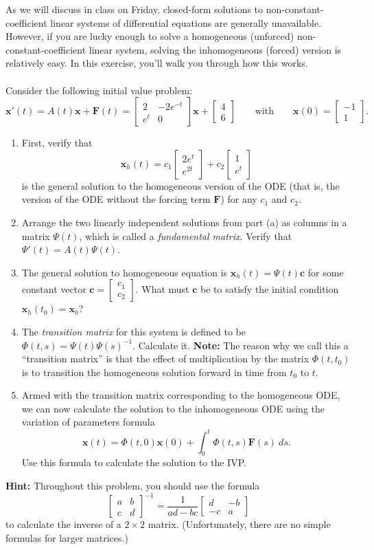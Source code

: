 \documentclass[12pt,letterpaper]{hmcpset}
\newcommand{\m}[1]{\begin{bmatrix} #1 \end{bmatrix}}
\newcommand{\f}[2]{\frac{#1}{#2}}
\renewcommand{\bf}[1]{\mathbf{#1}}
\begin{document}
\begin{problem}[3]
    As we will discuss in class on Friday, closed-form solutions to
    non-constant-coefficient linear systems of differential equations
    are generally unavailable.  However, if you are lucky enough to
    solve a homogeneous (unforced) non-constant-coefficient linear
    system, solving the inhomogeneous (forced) version is relatively
    easy.  In this exercise, you'll walk you through how this works.\\\\
    Consider the following initial value problem:
    \[
        \bf{x}'(t)=A(t)\bf{x}+\bf{F}(t)=\m{2&-2e^{-t}\\e^{t}&0}\bf{x}
        +\m{4\\6}\qquad\text{with}\qquad\bf{x}(0)=\m{-1\\1}.
    \]
    \begin{enumerate}
        \item First, verify that
            \[
                \bf{x}_h(t)=c_1\m{2e^{t}\\e^{2t}}+c_2\m{1\\e^{t}}
            \]
            is the general solution to the homogeneous version of the ODE
            (that is, the version of the ODE without the forcing term
            $\bf{F}$) for any $c_1$ and $c_2$.
        \item Arrange the two linearly independent solutions from part
            (a) as columns in a matrix $\Psi(t)$, which is called a
            \textit{fundamental matrix}. Verify that
            $\Psi'(t)=A(t)\Psi(t)$.
        \item The general solution to homogeneous equation is
            $\bf{x}_h(t)=\Psi(t)\bf{c}$ for some constant vector
            $\bf{c}=\m{c_1\\c_2}$. What must $\bf{c}$ be to satisfy the
            initial condition $\bf{x}_h(t_0)=\bf{x}_0$?
        \item The \textit{transition matrix} for this system is
            defined to be $\Phi(t,s)=\Psi(t)\Psi(s)^{-1}$. Calculate it.
            \textbf{Note:} The reason why we call this a ``transition
            matrix'' is that the effect of multiplication by the
            matrix $\Phi(t,t_0)$ is to transition the homogeneous
            solution forward in time from $t_0$ to $t$.
        \item Armed with the transition matrix corresponding to the
            homogeneous ODE, we can now calculate the solution to the
            inhomogeneous ODE using the variation of parameters formula
            \[
                \bf{x}(t)=\Phi(t,0)\bf{x}(0)
                +\int_{0}^{t}\Phi(t,s)\bf{F}(s)~ds.
            \]
            Use this formula to calculate the solution to the IVP.
    \end{enumerate}
    \textbf{Hint:} Throughout this problem, you should use the formula
    \[
        \m{a&b\\c&d}^{-1}=\f{1}{ad-bc}\m{d&-b\\-c&a}
    \]
    to calculate the inverse of a $2\times2$ matrix. (Unfortunately,
    there are no simple formulas for larger matrices.)
\end{problem}
\end{document}
